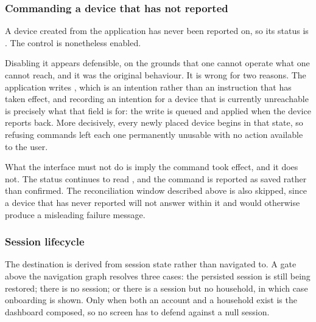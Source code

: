 \documentclass[11pt,a4paper]{article}
\begin{document}

\subsubsection{Commanding a device that has not reported}

A device created from the application has never been reported on, so its status
is . The control is nonetheless enabled.

Disabling it appears defensible, on the grounds that one cannot operate what one
cannot reach, and it was the original behaviour. It is wrong for two reasons.
The application writes , which is an intention rather than an
instruction that has taken effect, and recording an intention for a device that
is currently unreachable is precisely what that field is for: the write is
queued and applied when the device reports back. More decisively, every newly
placed device begins in that state, so refusing commands left each one
permanently unusable with no action available to the user.

What the interface must not do is imply the command took effect, and it does
not. The status continues to read , and the command is
reported as saved rather than confirmed. The reconciliation window described
above is also skipped, since a device that has never reported will not answer
within it and would otherwise produce a misleading failure message.

\subsubsection{Session lifecycle}

The destination is derived from session state rather than navigated to. A gate
above the navigation graph resolves three cases: the persisted session is still
being restored; there is no session; or there is a session but no household, in
which case onboarding is shown. Only when both an account and a household exist
is the dashboard composed, so no screen has to defend against a null session.
\end{document}
